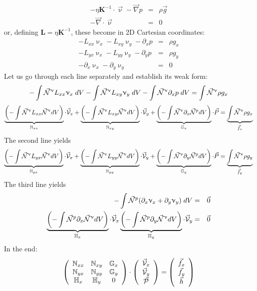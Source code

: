 \begin{eqnarray}
-\eta {\bm K}^{-1} \cdot \vec\upnu - \vec\nabla p &=& \rho \vec{g} \label{eq:darcy4} \\
-\vec\nabla \cdot \vec\upnu &=& 0
\end{eqnarray}
or, defining ${\bm L}=\eta {\bm K}^{-1}$, these become in 2D Cartesian coordinates:
\begin{eqnarray}
-L_{xx}\upnu_x-L_{xy}\upnu_y -\partial_x p &=&\rho g_x \\
-L_{yx}\upnu_x-L_{yy}\upnu_y -\partial_y p &=&\rho g_y \\
-\partial_x \upnu_x - \partial_y \upnu_y &=& 0
\end{eqnarray}
Let us go through each line separately and establish its weak form:
\[
-\int \vec{{\mathcal{N}}}^\upnu L_{xx} \upnu_x \; dV
-\int \vec{{\mathcal{N}}}^\upnu L_{xy} \upnu_y \; dV
-\int \vec{{\mathcal{N}}}^\upnu \partial_x p  \; dV = \int \vec{{\mathcal{N}}}^\upnu \rho g_x \]
\[
\underbrace{\left(-\int \vec{{\mathcal{N}}}^\upnu L_{xx} \vec{{\mathcal{N}}}^\upnu dV\right)}_{{\mathbb{N}}_{xx}} \cdot \vec{\cal V}_x
+
\underbrace{\left(-\int \vec{{\mathcal{N}}}^\upnu L_{xy} \vec{{\mathcal{N}}}^\upnu dV \right)}_{{\mathbb{N}}_{xy}} \cdot \vec{\cal V}_y
+
\underbrace{\left(-\int \vec{{\mathcal{N}}}^\upnu \partial_x \vec{{\mathcal{N}}}^p dV \right)}_{{\mathbb{G}}_x} \cdot \vec{P} 
= 
\underbrace{\int \vec{{\mathcal{N}}}^\upnu \rho g_x }_{\vec{f}_x}
\]
The second line yields
\[
\underbrace{\left(-\int \vec{{\mathcal{N}}}^\upnu L_{yx} \vec{{\mathcal{N}}}^\upnu dV\right)}_{{\mathbb{N}}_{yx}} \cdot \vec{\cal V}_x
+
\underbrace{\left(-\int \vec{{\mathcal{N}}}^\upnu L_{yy} \vec{{\mathcal{N}}}^\upnu dV\right)}_{{\mathbb{N}}_{yy}} \cdot \vec{\cal V}_y
+
\underbrace{\left(-\int \vec{{\mathcal{N}}}^\upnu \partial_y \vec{{\mathcal{N}}}^p dV\right)}_{{\mathbb{G}}_y} \cdot \vec{P} 
= 
\underbrace{\int \vec{{\mathcal{N}}}^\upnu \rho g_y }_{\vec{f}_y}
\]
The third line yields
\begin{eqnarray}
-\int \vec{{\mathcal{N}}}^p ( \partial_x \upnu_x + \partial_y \upnu_y) \; dV &=& \vec{0} \nonumber\\
\underbrace{\left(-\int \vec{{\mathcal{N}}}^p \partial_x \vec{{\mathcal{N}}}^\upnu dV \right)}_{{\mathbb{H}}_x} \cdot \vec{\cal V}_x
\underbrace{\left(-\int \vec{{\mathcal{N}}}^p \partial_y \vec{{\mathcal{N}}}^\upnu dV \right)}_{{\mathbb{H}}_y} \cdot \vec{\cal V}_y &=& \vec{0} 
\end{eqnarray}
In the end:
\[
\left(
\begin{array}{ccc}
{\mathbb{N}}_{xx} & {\mathbb{N}}_{xy} & {\mathbb{G}}_x \\
{\mathbb{N}}_{yx} & {\mathbb{N}}_{yy} & {\mathbb{G}}_y \\
{\mathbb{H}}_{x} & {\mathbb{H}}_y & 0 
\end{array}
\right)
\cdot
\left(
\begin{array}{c}
\vec{\cal V}_x \\
\vec{\cal V}_y \\ 
\vec{\cal P}
\end{array}
\right)
=
\left(
\begin{array}{c}
\vec{f}_x \\ 
\vec{f}_y \\ 
\vec{h}
\end{array}
\right)
\]
